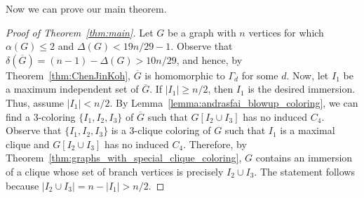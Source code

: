 \documentclass[a4paper,12pt]{article}
\newcommand{\Gcompl}{\overline{G}}
\begin{document}
\begin{figure}[ht]
    \centering
        \centering
    \caption{}
    \label{fig:induced-C4}
\end{figure}

Now we can prove our main theorem.

\begin{proof}[Proof of Theorem~\ref{thm:main}]
	Let \(G\) be a graph with \(n\) vertices for which \(\alpha(G) \leq 2\)
	and \(\Delta(G) < 19n/29 - 1\).
	Observe that \(\delta(\Gcompl) = (n-1) - \Delta(G) > 10n/29\),
	and hence, 
	by Theorem~\ref{thm:ChenJinKoh}, \(\Gcompl\) is homomorphic to \(\Gamma_d\) for some \(d\).	
%	
	Now, let \(I_1\) be a maximum independent set of \(\Gcompl\).
	If \(|I_1| \geq n/2\), then \(I_1\) is the desired immersion.
	Thus, assume \(|I_1| < n/2\).
	By Lemma~\ref{lemma:andrasfai_blowup_coloring},
	we can find a \(3\)-coloring \(\{I_1,I_2,I_3\}\) of \(\Gcompl\)
	such that \(G[I_2\cup I_3]\) has no induced \(C_4\).
	Observe that \(\{I_1,I_2,I_3\}\) 
	is a \(3\)-clique coloring of \(G\)
	such that \(I_1\) is a maximal clique and \(G[I_2\cup I_3]\) has no induced \(C_4\).
	Therefore, by Theorem~\ref{thm:graphs_with_special_clique_coloring},
	\(G\) contains an immersion of a clique whose set of branch vertices is precisely \(I_2\cup I_3\).
	The statement follows because \(|I_2 \cup I_3| = n - |I_1| > n/2\).
\end{proof}
\end{document}
